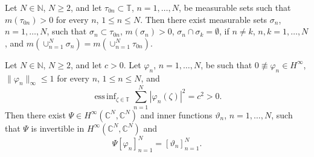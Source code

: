 \documentclass[10pt,a4paper]{amsart}
\begin{document}
\begin{lemma}\label{lemtau} Let $N\in\mathbb N$, $N\geq 2$, and let $\tau_{0n}\subset\mathbb T$, $n=1,\ldots, N$, be  
measurable sets such that $m(\tau_{0n})>0$ for every $n$, $1\leq n \leq N$. Then there exist measurable sets 
$\sigma_n$, $n=1,\ldots, N$, such that $\sigma_n\subset\tau_{0n}$, $m(\sigma_n)>0$, $\sigma_n\cap\sigma_k=\emptyset$, if $n\neq k$, 
$n,k=1, \ldots, N$, and  $m(\cup_{n=1}^N\sigma_n)=m(\cup_{n=1}^N\tau_{0n})$. 
\end{lemma}

  \begin{lemma} \label{lem1} Let $N\in\mathbb N$, $N\geq 2$, 
 and let $c>0$. Let $\varphi_n$, $n=1,\ldots, N$, be such that $0\not\equiv\varphi_n\in H^\infty$,  
$\|\varphi_n\|_\infty\leq 1$
 for every $n$, $1\leq n \leq N$, and 
\begin{equation*} \mathop{\mathrm{ess \, inf}}_{\zeta\in\mathbb T}\sum_{n=1}^N|\varphi_n(\zeta)|^2=c^2>0.
\end{equation*}
Then there exist $\Psi\in H^\infty(\mathbb C^N, \mathbb C^N)$ and inner functions $\vartheta_n$, $n=1,\ldots, N$, 
such that $\Psi$ is invertible in $H^\infty(\mathbb C^N, \mathbb C^N)$ and 
\begin{equation*} \Psi[\varphi_n]_{n=1}^N=[\vartheta_n]_{n=1}^N.
\end{equation*}
\end{lemma}
\end{document}
